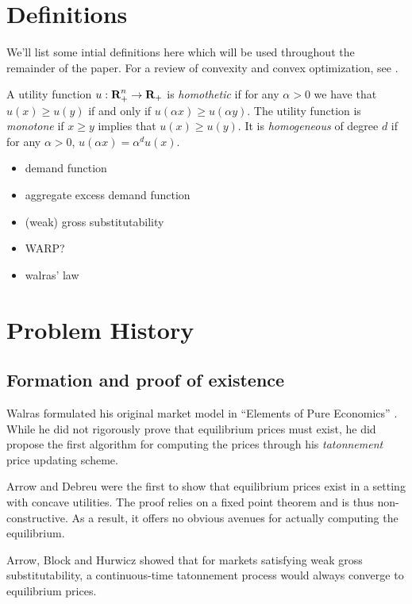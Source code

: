 \documentclass{article}
\begin{document}
\section{Definitions}
We'll list some intial definitions here which will be used throughout the remainder of the paper.
For a review of convexity and convex optimization, see
\cite{boyd2009convex}.

A utility function $u: {\mbox{\bf R}}^n_+ \to {\mbox{\bf R}}_+$ is \emph{homothetic} if for any $\alpha > 0$ we have that $u(x) \geq u(y)$ if and only if
$u(\alpha x) \geq u(\alpha y)$.
The utility function is \emph{monotone} if $x \geq y$ implies that $u(x) \geq u(y)$.
It is \emph{homogeneous} of degree $d$ if for any $\alpha > 0$,
$u(\alpha x) = \alpha^d u(x)$.

\begin{itemize}
\item demand function
\item aggregate excess demand function
\item (weak) gross substitutability
\item WARP?
\item walras' law
\end{itemize}



\section{Problem History}
\subsection{Formation and proof of existence}
Walras formulated his original market model in ``Elements of Pure Economics'' \cite{walras1896elements}. While he did not rigorously prove that equilibrium prices must exist, he did propose the first algorithm for computing the prices through his \emph{tatonnement} price updating scheme.

Arrow and Debreu \cite{arrow1954existence} were the first to show that equilibrium prices exist in a setting with concave utilities. The proof relies on a fixed point theorem and is thus non-constructive. As a result, it offers no obvious avenues for actually computing the equilibrium.

Arrow, Block and Hurwicz \cite{arrow1959stability} showed that for markets satisfying weak gross substitutability, a continuous-time tatonnement process would always converge to equilibrium prices.

\end{document}
